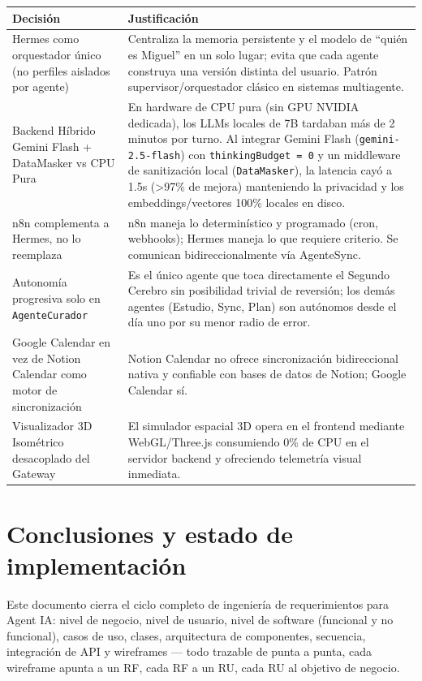 \documentclass[11pt,a4paper]{article}
\begin{document}
\begin{longtable}{@{}p{3.2cm}p{10.3cm}@{}}
\toprule
Decisión & Justificación \\
\midrule
\endhead
Hermes como orquestador único (no perfiles aislados por agente) & Centraliza la memoria persistente y el modelo de ``quién es Miguel'' en un solo lugar; evita que cada agente construya una versión distinta del usuario. Patrón supervisor/orquestador clásico en sistemas multiagente. \\
Backend Híbrido Gemini Flash + DataMasker vs CPU Pura & En hardware de CPU pura (sin GPU NVIDIA dedicada), los LLMs locales de 7B tardaban más de 2 minutos por turno. Al integrar Gemini Flash (\texttt{gemini-2.5-flash}) con \texttt{thinkingBudget = 0} y un middleware de sanitización local (\texttt{DataMasker}), la latencia cayó a 1.5s (>97\% de mejora) manteniendo la privacidad y los embeddings/vectores 100\% locales en disco. \\
n8n complementa a Hermes, no lo reemplaza & n8n maneja lo determinístico y programado (cron, webhooks); Hermes maneja lo que requiere criterio. Se comunican bidireccionalmente vía AgenteSync. \\
Autonomía progresiva solo en \texttt{AgenteCurador} & Es el único agente que toca directamente el Segundo Cerebro sin posibilidad trivial de reversión; los demás agentes (Estudio, Sync, Plan) son autónomos desde el día uno por su menor radio de error. \\
Google Calendar en vez de Notion Calendar como motor de sincronización & Notion Calendar no ofrece sincronización bidireccional nativa y confiable con bases de datos de Notion; Google Calendar sí. \\
Visualizador 3D Isométrico desacoplado del Gateway & El simulador espacial 3D opera en el frontend mediante WebGL/Three.js consumiendo 0\% de CPU en el servidor backend y ofreciendo telemetría visual inmediata. \\
\bottomrule
\end{longtable}

\section{Conclusiones y estado de implementación}

Este documento cierra el ciclo completo de ingeniería de requerimientos para Agent IA: nivel de negocio, nivel de usuario, nivel de software (funcional y no funcional), casos de uso, clases, arquitectura de componentes, secuencia, integración de API y wireframes --- todo trazable de punta a punta, cada wireframe apunta a un RF, cada RF a un RU, cada RU al objetivo de negocio.
\end{document}
